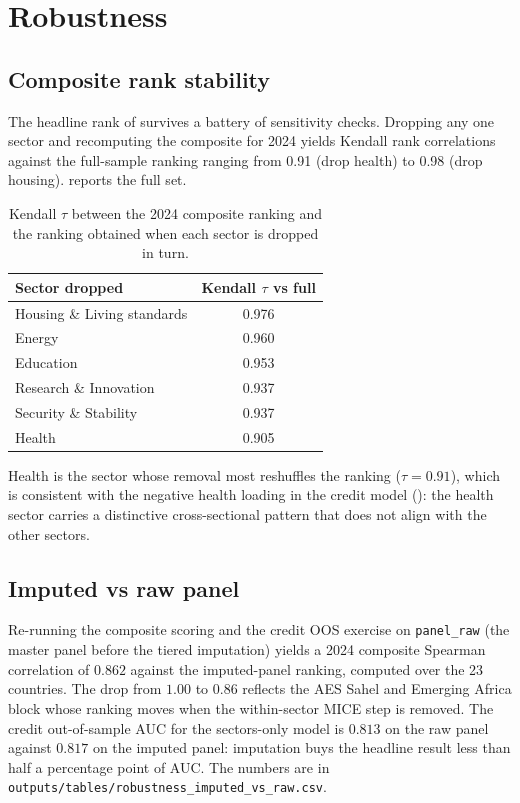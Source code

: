 \section{Robustness}\label{sec:robustness}

\subsection{Composite rank stability}

The headline rank of  survives a battery of sensitivity checks. Dropping any one sector and recomputing the composite for 2024 yields Kendall rank correlations against the full-sample ranking ranging from 0.91 (drop health) to 0.98 (drop housing).  reports the full set.

\begin{table}[h]
  \centering\small
  \begin{threeparttable}
  \caption{Kendall $\tau$ between the 2024 composite ranking and the ranking obtained when each sector is dropped in turn.}
  \label{tab:jackknife}
  \begin{tabular}{lc}
    \toprule
    Sector dropped & Kendall $\tau$ vs full \\
    \midrule
    Housing \& Living standards & 0.976 \\
    Energy & 0.960 \\
    Education & 0.953 \\
    Research \& Innovation & 0.937 \\
    Security \& Stability & 0.937 \\
    Health & 0.905 \\
    \bottomrule
  \end{tabular}
  \end{threeparttable}
\end{table}

Health is the sector whose removal most reshuffles the ranking ($\tau = 0.91$), which is consistent with the negative health loading in the credit model (): the health sector carries a distinctive cross-sectional pattern that does not align with the other sectors.

\subsection{Imputed vs raw panel}

Re-running the composite scoring and the credit OOS exercise on \texttt{panel\_raw} (the master panel before the tiered imputation) yields a 2024 composite Spearman correlation of $0.862$ against the imputed-panel ranking, computed over the 23 countries. The drop from $1.00$ to $0.86$ reflects the AES Sahel and Emerging Africa block whose ranking moves when the within-sector MICE step is removed. The credit out-of-sample AUC for the sectors-only model is $0.813$ on the raw panel against $0.817$ on the imputed panel: imputation buys the headline result less than half a percentage point of AUC. The numbers are in \texttt{outputs/tables/robustness\_imputed\_vs\_raw.csv}.

